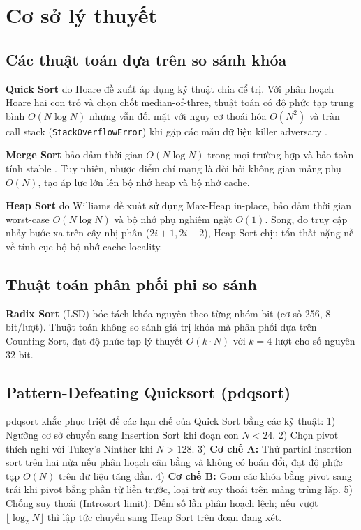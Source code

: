 \documentclass[conference]{IEEEtran}
\begin{document}
\section{Cơ sở lý thuyết}

\subsection{Các thuật toán dựa trên so sánh khóa}
\textbf{Quick Sort} do Hoare đề xuất \cite{hoare1962quicksort} áp dụng kỹ thuật chia để trị. Với phân hoạch Hoare hai con trỏ và chọn chốt median-of-three, thuật toán có độ phức tạp trung bình $O(N \log N)$ nhưng vẫn đối mặt với nguy cơ thoái hóa $O(N^2)$ và tràn call stack (\texttt{StackOverflowError}) khi gặp các mẫu dữ liệu killer adversary \cite{musser1997introsort, mcilroy1999killer}.

\textbf{Merge Sort} bảo đảm thời gian $O(N \log N)$ trong mọi trường hợp và bảo toàn tính stable \cite{sedgewick2011algorithms}. Tuy nhiên, nhược điểm chí mạng là đòi hỏi không gian mảng phụ $O(N)$, tạo áp lực lớn lên bộ nhớ heap và bộ nhớ cache.

\textbf{Heap Sort} do Williams đề xuất \cite{williams1964heapsort} sử dụng Max-Heap in-place, bảo đảm thời gian worst-case $O(N \log N)$ và bộ nhớ phụ nghiêm ngặt $O(1)$. Song, do truy cập nhảy bước xa trên cây nhị phân ($2i+1, 2i+2$), Heap Sort chịu tổn thất nặng nề về tính cục bộ bộ nhớ cache locality.

\subsection{Thuật toán phân phối phi so sánh}
\textbf{Radix Sort} (LSD) \cite{sedgewick2011algorithms} bóc tách khóa nguyên theo từng nhóm bit (cơ số 256, 8-bit/lượt). Thuật toán không so sánh giá trị khóa mà phân phối dựa trên Counting Sort, đạt độ phức tạp lý thuyết $O(k \cdot N)$ với $k=4$ lượt cho số nguyên 32-bit.

\subsection{Pattern-Defeating Quicksort (pdqsort)}
pdqsort \cite{peters2021pdqsort} khắc phục triệt để các hạn chế của Quick Sort bằng các kỹ thuật:
1) Ngưỡng cơ sở chuyển sang Insertion Sort khi đoạn con $N < 24$.
2) Chọn pivot thích nghi với Tukey's Ninther \cite{bentley1993engineering} khi $N > 128$.
3) \textbf{Cơ chế A:} Thử partial insertion sort trên hai nửa nếu phân hoạch cân bằng và không có hoán đổi, đạt độ phức tạp $O(N)$ trên dữ liệu tăng dần.
4) \textbf{Cơ chế B:} Gom các khóa bằng pivot sang trái khi pivot bằng phần tử liền trước, loại trừ suy thoái trên mảng trùng lặp.
5) Chống suy thoái (Introsort limit): Đếm số lần phân hoạch lệch; nếu vượt $\lfloor \log_2 N \rfloor$ thì lập tức chuyển sang Heap Sort trên đoạn đang xét.
\end{document}
